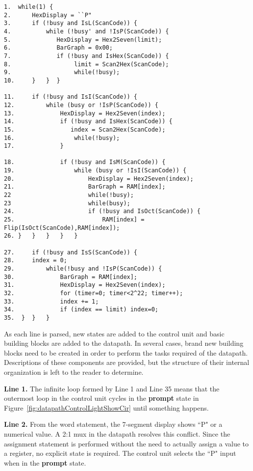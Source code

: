 \pagebreak
\begin{verbatim}
1.  while(1) {
2.      HexDisplay = ``P"
3.      if (!busy and IsL(ScanCode)) {
4.          while (!busy' and !IsP(ScanCode)) {
5.             HexDisplay = Hex2Seven(limit);
6.             BarGraph = 0x00;
7.             if (!busy and IsHex(ScanCode)) {
8.                  limit = Scan2Hex(ScanCode);
9.                  while(!busy);
10.     }   }  }

11.     if (!busy and IsI(ScanCode)) {
12.         while (busy or !IsP(ScanCode)) {
13.             HexDisplay = Hex2Seven(index);
14.             if (!busy and IsHex(ScanCode)) {
15.                index = Scan2Hex(ScanCode);
16.                 while(!busy);
17.             }

18.             if (!busy and IsM(ScanCode)) {
19.                 while (busy or !IsI(ScanCode)) {
20.                     HexDisplay = Hex2Seven(index);
21.                     BarGraph = RAM[index];
22             	        while(!busy);
23             	        while(busy);
24.                     if (!busy and IsOct(ScanCode)) {
25.                         RAM[index] = Flip(IsOct(ScanCode),RAM[index]);
26.	}   }   }   }   }

27.     if (!busy and IsS(ScanCode)) {
28.	    index = 0;
29.         while(!busy and !IsP(ScanCode)) {
30.             BarGraph = RAM[index];
31.             HexDisplay = Hex2Seven(index);
32.             for (timer=0; timer<2^22; timer++);
33.             index += 1;
34.             if (index == limit) index=0;
35.  }  }   }
\end{verbatim}

As each line is parsed, new states are added to the control unit and basic building 
blocks are added to the datapath.  In several cases, brand new building blocks need 
to be created in order to perform the tasks required of the datapath.  Descriptions of
these components are provided, but the structure of their internal organization 
is left to the reader to determine.

\textbf{ Line 1.} The infinite loop formed by Line 1 and Line 35 means that the outermost loop 
in the control unit cycles in the \textbf{ prompt} state in Figure~\ref{fig:datapathControlLightShowCir} 
until something happens.

\textbf{ Line 2.} From the word statement, the 7-segment display shows ``P" or a numerical value.
A 2:1 mux in the datapath resolves this conflict. Since the assignment statement
is performed without the need to actually assign a value to a register, no 
explicit state is required.  The control unit selects the ``P" input when in the 
\textbf{ prompt} state.  

